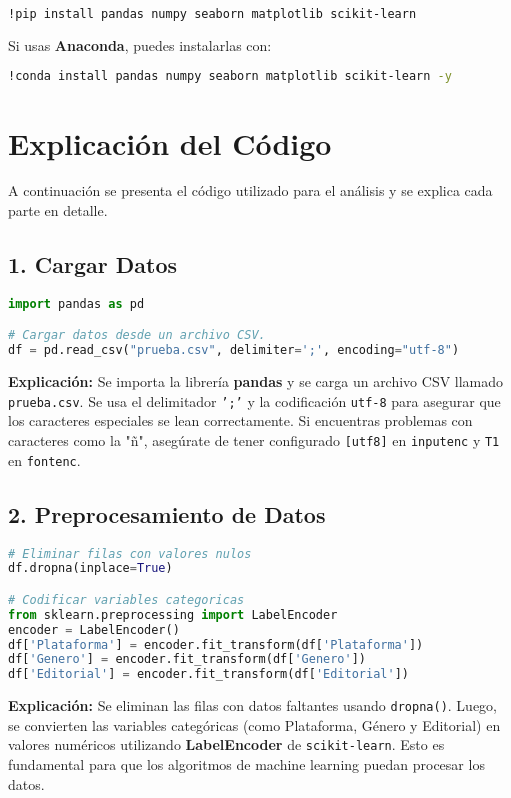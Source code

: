 \documentclass[12pt]{article}
\begin{document}
\begin{lstlisting}[language=bash]
!pip install pandas numpy seaborn matplotlib scikit-learn
\end{lstlisting}

Si usas \textbf{Anaconda}, puedes instalarlas con:
\begin{lstlisting}[language=bash]
!conda install pandas numpy seaborn matplotlib scikit-learn -y
\end{lstlisting}

\section{Explicación del Código}
A continuación se presenta el código utilizado para el análisis y se explica cada parte en detalle.

\subsection{1. Cargar Datos}
\begin{lstlisting}[language=Python]
import pandas as pd

# Cargar datos desde un archivo CSV.
df = pd.read_csv("prueba.csv", delimiter=';', encoding="utf-8")
\end{lstlisting}
\textbf{Explicación:}  
Se importa la librería \textbf{pandas} y se carga un archivo CSV llamado \texttt{prueba.csv}. Se usa el delimitador \texttt{';'} y la codificación \texttt{utf-8} para asegurar que los caracteres especiales se lean correctamente. Si encuentras problemas con caracteres como la "ñ", asegúrate de tener configurado \texttt{[utf8]} en \texttt{inputenc} y \texttt{T1} en \texttt{fontenc}.

\subsection{2. Preprocesamiento de Datos}
\begin{lstlisting}[language=Python]
# Eliminar filas con valores nulos
df.dropna(inplace=True)

# Codificar variables categoricas
from sklearn.preprocessing import LabelEncoder
encoder = LabelEncoder()
df['Plataforma'] = encoder.fit_transform(df['Plataforma'])
df['Genero'] = encoder.fit_transform(df['Genero'])
df['Editorial'] = encoder.fit_transform(df['Editorial'])
\end{lstlisting}
\textbf{Explicación:}  
Se eliminan las filas con datos faltantes usando \texttt{dropna()}. Luego, se convierten las variables categóricas (como Plataforma, Género y Editorial) en valores numéricos utilizando \textbf{LabelEncoder} de \texttt{scikit-learn}. Esto es fundamental para que los algoritmos de machine learning puedan procesar los datos.
\end{document}
